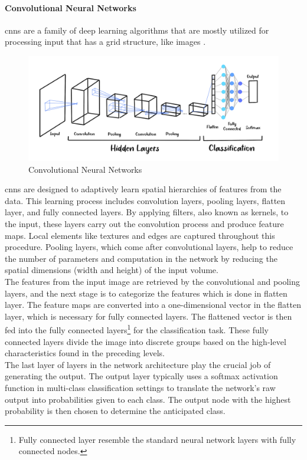 \paragraph{Convolutional Neural Networks}
\nocite{ibm_2023_what_cnn}
\nocite{mishra_2020_convolutional}
\nocite{mandal_2021_cnn}
\nocite{saha_2018_a}
\gls{cnns} are a family of deep learning algorithms that are mostly utilized for processing input that has a grid structure, like images \citep{yamashita_2018_convolutional}.
\begin{figure}[H]
    \centering
    \includegraphics[width=16cm]{Images/cnns.png}
    \caption{Convolutional Neural Networks}
    \label{fig:cnns}
\end{figure}
\indent \gls{cnns} are designed to adaptively learn spatial hierarchies of features from the data. 
This learning process includes convolution layers, pooling layers, flatten layer, and fully connected layers.
By applying filters, also known as kernels, to the input, these layers carry out the convolution process and produce feature maps. 
Local elements like textures and edges are captured throughout this procedure.
Pooling layers, which come after convolutional layers, help to reduce the number of parameters and computation in the network by reducing the spatial dimensions (width and height) of the input volume. 
\\
\indent The features from the input image are retrieved by the convolutional and pooling layers, and the next stage is to categorize the features which is done in flatten layer.
The feature maps are converted into a one-dimensional vector in the flatten layer, which is necessary for fully connected layers.
The flattened vector is then fed into the fully connected layers\footnote{Fully connected layer resemble the standard neural network layers with fully connected nodes.} for the classification task. 
These fully connected layers divide the image into discrete groups based on the high-level characteristics found in the preceding levels.
\\
\indent The last layer of layers in the network architecture play the crucial job of generating the output.
The output layer typically uses a softmax activation function in multi-class classification settings to translate the network's raw output into probabilities given to each class. 
The output node with the highest probability is then chosen to determine the anticipated class.
\\
